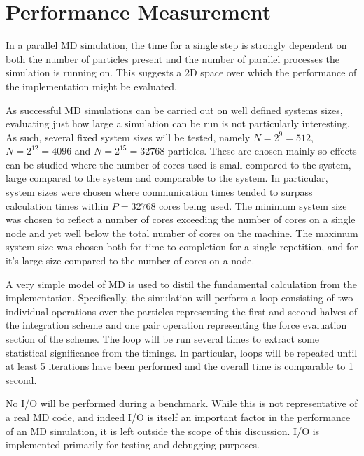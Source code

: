\section{Performance Measurement}

%
In a parallel MD simulation, the time for a single step is strongly dependent
on both the number of particles present and
the number of parallel processes the simulation is running on.
%
This suggests a 2D space over which the performance of the implementation
might be evaluated.

%
As successful MD simulations can be carried out on well defined
systems sizes, evaluating just how large a simulation can be run
is not particularly interesting.
%
As such, several fixed system sizes will be tested, namely
$N = 2^{9} = 512$,
$N = 2^{12} = 4096$ and
$N = 2^{15} = 32768$
particles.
%
These are chosen mainly so effects can be studied where the number of cores
used is small compared to the system, large compared to the system
and comparable to the system.
%
In particular, system sizes were chosen where communication times
tended to surpass calculation times within $P = 32768$ cores
being used.
%
The minimum system size was chosen to reflect a number of cores
exceeding the number of cores on a single \hector{} node and yet well
below the total number of cores on the machine.
%
The maximum system size was chosen both for time to completion for
a single repetition, and for it's large size compared to the number of
cores on a \hector{} node.

%
A very simple model of MD is used to distil the fundamental calculation
from the implementation.
%
Specifically, the simulation will perform a loop consisting of two
individual operations over the particles representing the first
and second halves of the \velocityverlet{} integration scheme and one
pair operation representing the force evaluation section of the scheme.
%
The loop will be run several times to extract some statistical significance
from the timings.
%
In particular, loops will be repeated until at least 5 iterations
have been performed and the overall time is comparable to 1 second.

%
No I/O will be performed during a benchmark.
%
While this is not representative of a real MD code, and indeed I/O
is itself an important factor in the performance of an MD simulation,
it is left outside the scope of this discussion.
%
I/O is implemented primarily for testing and debugging purposes.

